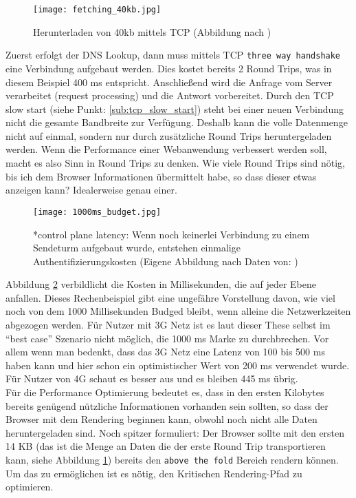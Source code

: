 		\begin{figure}[htbp]
			\begin{center}
				\texttt{[image: fetching\_40kb.jpg]}
				\caption{Herunterladen von 40kb mittels TCP (Abbildung nach \autocite{grigorikTCP})}
				\label{fig:fetching_40kb}
			\end{center}
		\end{figure}

		Zuerst erfolgt der DNS Lookup, dann muss mittels TCP \texttt{three way handshake} eine Verbindung aufgebaut werden. Dies kostet bereits 2 Round Trips, was in diesem Beispiel 400 ms entspricht. Anschließend wird die Anfrage vom Server verarbeitet (request processing) und die Antwort vorbereitet.
		Durch den TCP slow start (siehe Punkt: \ref{sub:tcp_slow_start}) steht bei einer neuen Verbindung nicht die gesamte Bandbreite zur Verfügung. Deshalb kann die volle Datenmenge nicht auf einmal, sondern nur durch zusätzliche Round Trips heruntergeladen werden. Wenn die Performance einer Webanwendung verbessert werden soll, macht es also Sinn in Round Trips zu denken. Wie viele Round Trips sind nötig, bis ich dem Browser Informationen übermittelt habe, so dass dieser etwas anzeigen kann? Idealerweise genau einer. 
		
		\begin{figure}[htbp]
			\begin{center}
				\texttt{[image: 1000ms\_budget.jpg]}
				\caption{*control plane latency: Wenn noch keinerlei Verbindung zu einem Sendeturm aufgebaut wurde, entstehen einmalige Authentifizierungskosten (Eigene Abbildung nach Daten von: \autocite{venturebeat}\autocite[p. 7, 12]{grigorikRadio})}
				\label{fig:1000ms_budget}
			\end{center}
		\end{figure}

		Abbildung \ref{fig:1000ms_budget} verbildlicht die Kosten in Millisekunden, die auf jeder Ebene anfallen. Dieses Rechenbeispiel gibt eine ungefähre Vorstellung davon, wie viel noch von dem 1000 Millisekunden Budged bleibt, wenn alleine die Netzwerkzeiten abgezogen werden. Für Nutzer mit 3G Netz ist es laut dieser These selbst im "`best case"' Szenario nicht möglich, die 1000 ms Marke zu durchbrechen. Vor allem wenn man bedenkt, dass das 3G Netz eine Latenz von 100 bis 500 ms haben kann und hier schon ein optimistischer Wert von 200 ms verwendet wurde. Für Nutzer von 4G schaut es besser aus und es bleiben 445 ms übrig.\\
		Für die Performance Optimierung bedeutet es, dass in den ersten Kilobytes bereits genügend nützliche Informationen vorhanden sein sollten, so dass der Browser mit dem Rendering beginnen kann, obwohl noch nicht alle Daten heruntergeladen sind. Noch spitzer formuliert: Der Browser sollte mit den ersten 14 KB (das ist die Menge an Daten die der erste Round Trip transportieren kann, siehe Abbildung \ref{fig:fetching_40kb}) bereits den \texttt{above the fold} Bereich rendern können. Um das zu ermöglichen ist es nötig, den Kritischen Rendering-Pfad zu optimieren.
		
